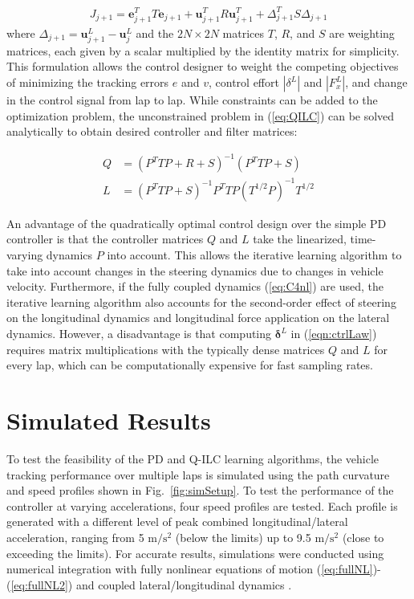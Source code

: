 \begin{align}
J_{j\!+\!1} = \textbf{e}_{j\!+\!1}^TT\textbf{e}_{j\!+\!1} + \textbf{u}^T_{j\!+\!1} R \textbf{u}^T_{j\!+\!1}+\Delta_{j\!+\!1}^TS\Delta_{j\!+\!1}
\label{eq:QILC}
\end{align}
where $\Delta_{j\!+\!1} = \mathbf{u}^L_{j\!+\!1} - \mathbf{u}^L_j$ and the $2N \times 2N$ matrices $T$, $R$, and $S$ are weighting matrices, each given
by a scalar multiplied by the identity matrix for simplicity.
This formulation allows the control designer to weight the competing objectives of minimizing the tracking errors $e$ and $v$, control effort $|\delta^L|$ and $|F^L_x|$, and change in the control signal from lap to lap.
While constraints can be added to the optimization problem, the unconstrained problem in (\ref{eq:QILC}) can be solved analytically \cite{bristow2008} to obtain desired controller and filter matrices:

\begin{subequations}
\label{eq:analSol}
\begin{align}
	Q &= (P^TTP + R + S)^{-1}(P^TTP + S)\\
	L &= (P^TTP + S)^{-1}P^TTP(T^{1/2}P)^{-1}T^{1/2}
\end{align}
\end{subequations}

An advantage of the quadratically optimal control design over the simple PD controller is that the controller matrices $Q$ and $L$ take the linearized, time-varying dynamics $P$ into account. 
This allows the iterative learning algorithm
to take into account changes in the steering dynamics due to changes in vehicle velocity.
Furthermore, if the fully coupled dynamics (\ref{eq:C4nl}) are used, the iterative learning algorithm also accounts for the
second-order effect of steering on the longitudinal dynamics and longitudinal force application on the lateral dynamics. 
 However, a disadvantage is that computing $\mathbf{\delta}^L$ in (\ref{eqn:ctrlLaw}) requires matrix multiplications with
the typically dense matrices $Q$ and $L$ for every lap, which can be computationally expensive for fast sampling rates. 

\section{Simulated Results}
\label{sec:simres}

To test the feasibility of the PD and Q-ILC learning algorithms, the vehicle tracking performance over multiple laps is
simulated using the path curvature and speed profiles shown in Fig.~\ref{fig:simSetup}. To test the performance
of the controller at varying accelerations, four speed profiles are tested. Each profile is
generated with a different level of peak combined longitudinal/lateral acceleration, ranging from 5 $\mathrm{m/s^2}$ (below the limits)
up to 9.5 $\mathrm{m/s^2}$ (close to exceeding the limits). For accurate results, simulations were conducted using numerical integration with
 fully nonlinear equations of motion (\ref{eq:fullNL})-(\ref{eq:fullNL2}) and coupled lateral/longitudinal dynamics \cite{rami}.

